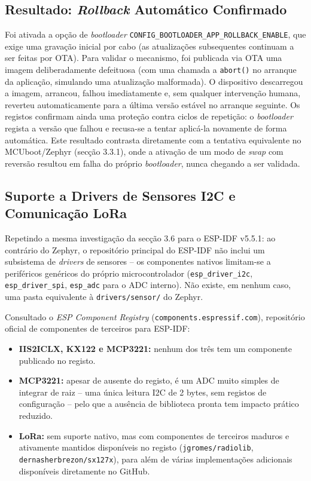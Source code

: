 \documentclass[a4paper,12pt]{article}
\begin{document}
\subsection{Resultado: \textit{Rollback} Automático Confirmado}
Foi ativada a opção de \textit{bootloader} \texttt{CONFIG\_BOOTLOADER\_APP\_ROLLBACK\_ENABLE}, que exige uma gravação inicial por cabo (as atualizações subsequentes continuam a ser feitas por OTA). Para validar o mecanismo, foi publicada via OTA uma imagem deliberadamente defeituosa (com uma chamada a \texttt{abort()} no arranque da aplicação, simulando uma atualização malformada). O dispositivo descarregou a imagem, arrancou, falhou imediatamente e, sem qualquer intervenção humana, reverteu automaticamente para a última versão estável no arranque seguinte. Os registos confirmam ainda uma proteção contra ciclos de repetição: o \textit{bootloader} regista a versão que falhou e recusa-se a tentar aplicá-la novamente de forma automática. Este resultado contrasta diretamente com a tentativa equivalente no MCUboot/Zephyr (secção 3.3.1), onde a ativação de um modo de \textit{swap} com reversão resultou em falha do próprio \textit{bootloader}, nunca chegando a ser validada.

\subsection{Suporte a Drivers de Sensores I2C e Comunicação LoRa}
Repetindo a mesma investigação da secção 3.6 para o ESP-IDF v5.5.1: ao contrário do Zephyr, o repositório principal do ESP-IDF não inclui um subsistema de \textit{drivers} de sensores -- os componentes nativos limitam-se a periféricos genéricos do próprio microcontrolador (\texttt{esp\_driver\_i2c}, \texttt{esp\_driver\_spi}, \texttt{esp\_adc} para o ADC interno). Não existe, em nenhum caso, uma pasta equivalente à \texttt{drivers/sensor/} do Zephyr.

Consultado o \textit{ESP Component Registry} (\texttt{components.espressif.com}), repositório oficial de componentes de terceiros para ESP-IDF:
\begin{itemize}
    \item \textbf{IIS2ICLX, KX122 e MCP3221:} nenhum dos três tem um componente publicado no registo.
    \item \textbf{MCP3221:} apesar de ausente do registo, é um ADC muito simples de integrar de raiz -- uma única leitura I2C de 2 bytes, sem registos de configuração -- pelo que a ausência de biblioteca pronta tem impacto prático reduzido.
    \item \textbf{LoRa:} sem suporte nativo, mas com componentes de terceiros maduros e ativamente mantidos disponíveis no registo (\texttt{jgromes/radiolib}, \texttt{dernasherbrezon/sx127x}), para além de várias implementações adicionais disponíveis diretamente no GitHub.
\end{itemize}
\end{document}
